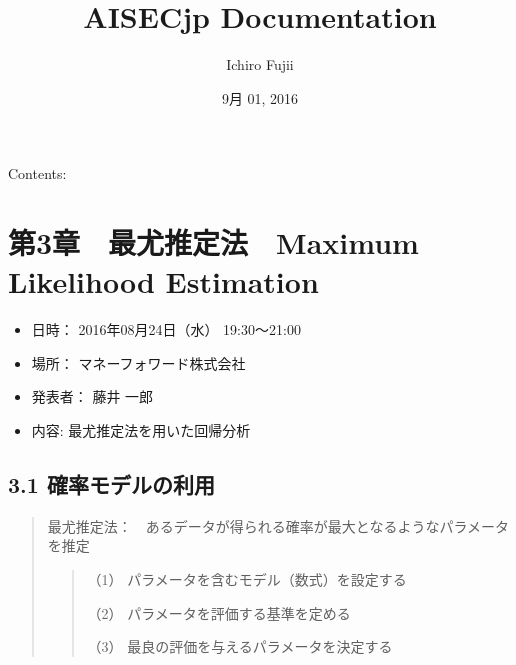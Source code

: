 \documentclass[letterpaper,10pt,dvipdfmx]{sphinxmanual}
\title{AISECjp Documentation}
\date{9月 01, 2016}
\author{Ichiro Fujii}
\begin{document}
\maketitle
\tableofcontents
{}\label{index::doc}


Contents:


\chapter{第3章　最尤推定法　Maximum Likelihood Estimation}
\label{Chapter_3_MLE:welcome-to-aisecjp-s-documentation}\label{Chapter_3_MLE:maximum-likelihood-estimation}\label{Chapter_3_MLE::doc}\begin{itemize}
\item {} 
日時： 2016年08月24日（水） 19:30～21:00

\item {} 
場所： マネーフォワード株式会社

\item {} 
発表者： 藤井 一郎

\item {} 
内容: 最尤推定法を用いた回帰分析

\end{itemize}


\section{3.1 確率モデルの利用}
\label{Chapter_3_MLE:id1}\begin{quote}

最尤推定法：　あるデータが得られる確率が最大となるようなパラメータを推定
\begin{quote}

（1） パラメータを含むモデル（数式）を設定する

（2） パラメータを評価する基準を定める

（3） 最良の評価を与えるパラメータを決定する
\end{quote}
\end{quote}
\end{document}
